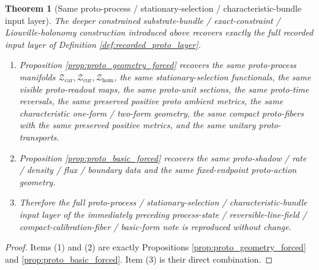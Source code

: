 \documentclass[11pt]{article}
\newcommand{\TensorProtoSpace}{\mathcal Z_{\mathrm{car}}}
\newcommand{\CurProtoSpace}{\mathcal Z_{\mathrm{cur}}}
\newcommand{\HomProtoSpace}{\mathcal Z_{\mathrm{hom}}}
\newtheorem{theorem}{Theorem}
\begin{document}
\begin{theorem}[Same proto-process / stationary-selection / characteristic-bundle input layer]
\label{thm:same_proto_input}
The deeper constrained substrate-bundle / exact-constraint / Liouville-holonomy construction introduced above recovers exactly the full recorded input layer of Definition \ref{def:recorded_proto_layer}.
\begin{enumerate}
    \item Proposition \ref{prop:proto_geometry_forced} recovers the same proto-process manifolds \(\TensorProtoSpace,\CurProtoSpace,\HomProtoSpace\), the same stationary-selection functionals, the same visible proto-readout maps, the same proto-unit sections, the same proto-time reversals, the same preserved positive proto ambient metrics, the same characteristic one-form / two-form geometry, the same compact proto-fibers with the same preserved positive metrics, and the same unitary proto-transports.
    \item Proposition \ref{prop:proto_basic_forced} recovers the same proto-shadow / rate / density / flux / boundary data and the same fixed-endpoint proto-action geometry.
    \item Therefore the full proto-process / stationary-selection / characteristic-bundle input layer of the immediately preceding process-state / reversible-line-field / compact-calibration-fiber / basic-form note is reproduced without change.
\end{enumerate}
\end{theorem}

\begin{proof}
Items (1) and (2) are exactly Propositions \ref{prop:proto_geometry_forced} and \ref{prop:proto_basic_forced}. Item (3) is their direct combination.
\end{proof}
\end{document}
